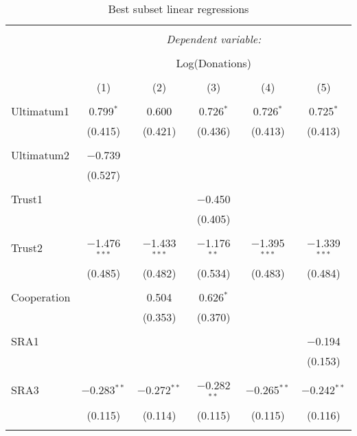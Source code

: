   



\begin{table}[H] \centering 
  \caption{Best subset linear regressions} 
  \label{} 
     \begin{adjustbox}{width=\textwidth, totalheight=\baselineskip}
     \begin{tabular}{@{\extracolsep{5pt}}lccccc} 
\\[-1.8ex]\hline 
\hline \\[-1.8ex] 
 & \multicolumn{5}{c}{\textit{Dependent variable:}} \\ 
\cline{2-6} 
\\[-1.8ex] & \multicolumn{5}{c}{Log(Donations)} \\ 
\\[-1.8ex] & (1) & (2) & (3) & (4) & (5)\\ 
\hline \\[-1.8ex] 
 Ultimatum1 & 0.799$^{*}$ & 0.600 & 0.726$^{*}$ & 0.726$^{*}$ & 0.725$^{*}$ \\ 
  & (0.415) & (0.421) & (0.436) & (0.413) & (0.413) \\ 
  & & & & & \\ 
 Ultimatum2 & $-$0.739 &  &  &  &  \\ 
  & (0.527) &  &  &  &  \\ 
  & & & & & \\ 
 Trust1 &  &  & $-$0.450 &  &  \\ 
  &  &  & (0.405) &  &  \\ 
  & & & & & \\ 
 Trust2 & $-$1.476$^{***}$ & $-$1.433$^{***}$ & $-$1.176$^{**}$ & $-$1.395$^{***}$ & $-$1.339$^{***}$ \\ 
  & (0.485) & (0.482) & (0.534) & (0.483) & (0.484) \\ 
  & & & & & \\ 
 Cooperation &  & 0.504 & 0.626$^{*}$ &  &  \\ 
  &  & (0.353) & (0.370) &  &  \\ 
  & & & & & \\ 
 SRA1 &  &  &  &  & $-$0.194 \\ 
  &  &  &  &  & (0.153) \\ 
  & & & & & \\ 
 SRA3 & $-$0.283$^{**}$ & $-$0.272$^{**}$ & $-$0.282$^{**}$ & $-$0.265$^{**}$ & $-$0.242$^{**}$ \\ 
  & (0.115) & (0.114) & (0.115) & (0.115) & (0.116) \\ 
  & & & & & \\ 

\end{tabular}
\end{adjustbox}
\end{table}
